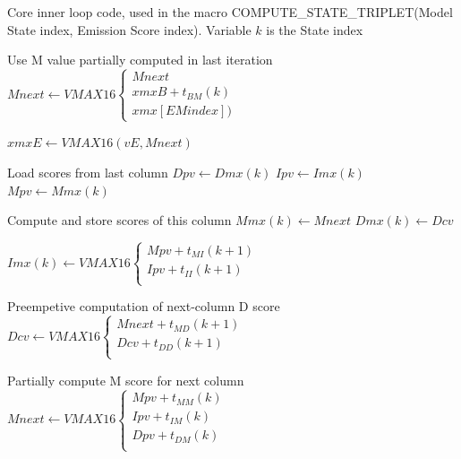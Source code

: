 \clearpage



\begin{algorithm}[h!]
\caption{Core inner loop code, used in the macro COMPUTE\_STATE\_TRIPLET(Model State index, Emission Score index). Variable $k$ is the State index}
\label{code-compute}

\begin{algorithmic}[1]
\item[]
\LeftComment Use M value partially computed in last iteration
\State $ Mnext \gets VMAX16
			\begin{cases}
				Mnext \\						
				xmxB + t_{BM}(k)	\\
				xmx[EMindex])
			\end{cases} $ 
\item[]
\item[]
\State $ xmxE \gets VMAX16(vE, Mnext) $		
\item[]
\LeftComment Load scores from last column
\State $ Dpv \gets Dmx(k) $
\State $ Ipv  \gets Imx(k)  $
\State $ Mpv \gets Mmx(k) $
\item[]
\LeftComment Compute and store scores of this column
\State $ Mmx(k) \gets Mnext $
\State $ Dmx(k) \gets Dcv   $

\State $ Imx(k) \gets VMAX16
			\begin{cases}
				Mpv +  t_{MI}(k+1)	\\
				Ipv +  t_{II}(k+1)	\\
			\end{cases} $ 
\item[]
\item[]
\LeftComment Preempetive computation of next-column D score
\State $ Dcv \gets VMAX16
			\begin{cases}
				Mnext +  t_{MD}(k+1)	\\
				Dcv +  t_{DD}(k+1)	\\
			\end{cases} $ 
\item[]
\item[]
\LeftComment Partially compute M score for next column
\State $ Mnext \gets VMAX16
			\begin{cases}
				Mpv + t_{MM}(k)	\\
				Ipv  + t_{IM}(k)	\\
				Dpv + t_{DM}(k)	\\
			\end{cases} $ 
\item[]
\end{algorithmic}
\end{algorithm}
			
